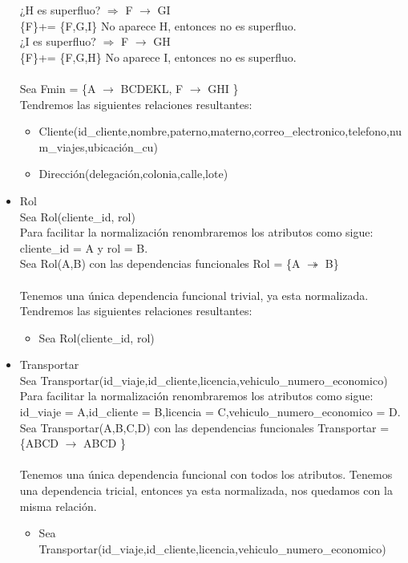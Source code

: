\documentclass{article}
\begin{document}
\begin{itemize}
¿H es superfluo? $\Rightarrow$ F $\rightarrow$ GI \\
\{F\}+= \{F,G,I\} No aparece H, entonces no es superfluo.\\
¿I es superfluo? $\Rightarrow$ F $\rightarrow$ GH \\
\{F\}+= \{F,G,H\} No aparece I, entonces no es superfluo.\\
\\
Sea Fmin = \{A $\rightarrow$ BCDEKL, F $\rightarrow$ GHI  \} \\
Tendremos las siguientes relaciones resultantes:
\begin{itemize}
\item Cliente(id\_cliente,nombre,paterno,materno,correo\_electronico,telefono,num\_viajes,ubicación\_cu)
\item Dirección(delegación,colonia,calle,lote)
\end{itemize}


\item Rol\\
Sea Rol(cliente\_id, rol)\\
Para facilitar la normalización renombraremos los atributos como sigue:
cliente\_id = A y rol = B.\\
Sea Rol(A,B) con las dependencias funcionales
Rol = \{A $\twoheadrightarrow$ B\} \\
\\
Tenemos una única dependencia funcional trivial, ya esta normalizada.
Tendremos las siguientes relaciones resultantes:
\begin{itemize}
\item Sea Rol(cliente\_id, rol)\\
\end{itemize}

\item Transportar\\
Sea Transportar(id\_viaje,id\_cliente,licencia,vehiculo\_numero\_economico)\\
Para facilitar la normalización renombraremos los atributos como sigue:
id\_viaje = A,id\_cliente = B,licencia = C,vehiculo\_numero\_economico = D.\\
Sea Transportar(A,B,C,D) con las dependencias funcionales
Transportar = \{ABCD $\rightarrow$ ABCD \} \\
\\
Tenemos una única dependencia funcional con todos los atributos. Tenemos
una dependencia tricial, entonces ya esta normalizada, nos quedamos con la
misma relación.
\begin{itemize}
\item Sea Transportar(id\_viaje,id\_cliente,licencia,vehiculo\_numero\_economico) \\
\end{itemize}


\end{itemize}
\end{document}
